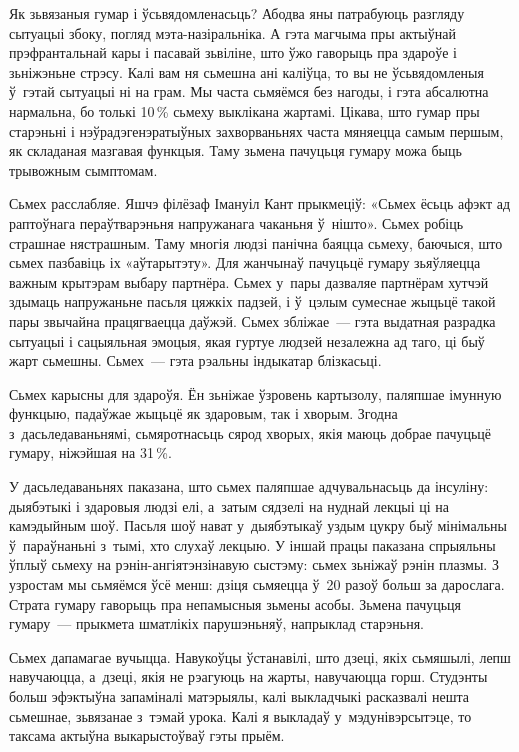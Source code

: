 Як зьвязаныя гумар і ўсьвядомленасьць? Абодва яны патрабуюць разгляду сытуацыі збоку, погляд мэта-назіральніка. А гэта магчыма пры актыўнай прэфрантальнай кары і пасавай зьвіліне, што ўжо гаворыць пра здароўе і зьніжэньне стрэсу. Калі вам ня сьмешна ані каліўца, то вы не ўсьвядомленыя ў~гэтай сытуацыі ні на грам. Мы часта сьмяёмся без нагоды, і гэта абсалютна нармальна, бо толькі 10\,\% сьмеху выклікана жартамі. Цікава, што гумар пры старэньні і нэўрадэгенэратыўных захворваньнях часта мяняецца самым першым, як складаная мазгавая функцыя. Таму зьмена пачуцьця гумару можа быць трывожным сымптомам.

Сьмех расслабляе. Яшчэ філёзаф Імануіл Кант прыкмеціў: «Сьмех ёсьць афэкт ад раптоўнага пераўтварэньня напружанага чаканьня ў~нішто». Сьмех робіць страшнае нястрашным. Таму многія людзі панічна баяцца сьмеху, баючыся, што сьмех пазбавіць іх «аўтарытэту». Для жанчынаў пачуцьцё гумару зьяўляецца важным крытэрам выбару партнёра. Сьмех у~пары дазваляе партнёрам хутчэй здымаць напружаньне пасьля цяжкіх падзей, і ў~цэлым сумеснае жыцьцё такой пары звычайна працягваецца даўжэй. Сьмех збліжае~--- гэта выдатная разрадка сытуацыі і сацыяльная эмоцыя, якая гуртуе людзей незалежна ад таго, ці быў жарт сьмешны. Сьмех~--- гэта рэальны індыкатар блізкасьці.

Сьмех карысны для здароўя. Ён зьніжае ўзровень картызолу, паляпшае імунную функцыю, падаўжае жыцьцё як здаровым, так і хворым. Згодна з~дасьледаваньнямі, сьмяротнасьць сярод хворых, якія маюць добрае пачуцьцё гумару, ніжэйшая на 31\,\%. 

У дасьледаваньнях паказана, што сьмех паляпшае адчувальнасьць да інсуліну: дыябэтыкі і здаровыя людзі елі, а~затым сядзелі на нуднай лекцыі ці на камэдыйным шоў. Пасьля шоў нават у~дыябэтыкаў уздым цукру быў мінімальны ў~параўнаньні з~тымі, хто слухаў лекцыю. У іншай працы паказана спрыяльны ўплыў сьмеху на рэнін-ангіятэнзінавую сыстэму: сьмех зьніжаў рэнін плазмы. З узростам мы сьмяёмся ўсё менш: дзіця сьмяецца ў~20 разоў больш за дарослага. Страта гумару гаворыць пра непамысныя зьмены асобы. Зьмена пачуцьця гумару~--- прыкмета шматлікіх парушэньняў, напрыклад старэньня. 

Сьмех дапамагае вучыцца. Навукоўцы ўстанавілі, што дзеці, якіх сьмяшылі, лепш навучаюцца, а~дзеці, якія не рэагуюць на жарты, навучаюцца горш. Студэнты больш эфэктыўна запаміналі матэрыялы, калі выкладчыкі расказвалі нешта сьмешнае, зьвязанае з~тэмай урока. Калі я выкладаў у~мэдунівэрсытэце, то таксама актыўна выкарыстоўваў гэты прыём.

